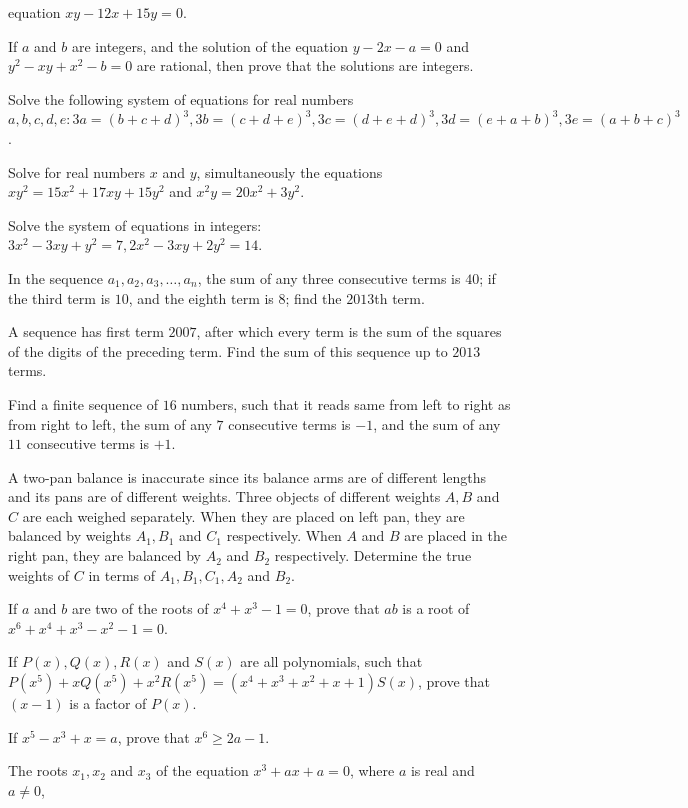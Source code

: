   equation $xy - 12x + 15y = 0$.
\item If $a$ and $b$ are integers, and the solution of the equation $y - 2x - a = 0$ and $y^2 - xy + x^2 - b
  = 0$ are rational, then prove that the solutions are integers.
\item Solve the following system of equations for real numbers $a, b, c, d, e: 3a = (b + c + d)^3, 3b = (c +
  d + e)^3, 3c = (d + e + d)^3, 3d = (e + a + b)^3, 3e = (a + b + c)^3$.
\item Solve for real numbers $x$ and $y$, simultaneously the equations $xy^2 = 15x^2 + 17xy + 15y^2$ and
  $x^2y = 20x^2 + 3y^2$.
\item Solve the system of equations in integers: $3x^2 - 3xy + y^2 = 7, 2x^2 - 3xy + 2y^2 = 14$.
\item In the sequence $a_1, a_2, a_3, \ldots, a_n$, the sum of any three consecutive terms is $40$; if the
  third term is $10$, and the eighth term is $8$; find the $2013$th term.
\item A sequence  has first term $2007$, after which every term is the sum of the squares of the digits of
  the preceding term. Find the sum of this sequence up to $2013$ terms.
\item Find a finite sequence of $16$ numbers, such that it reads same from left to right as from right to
  left, the sum of any $7$ consecutive terms is $-1$, and the sum of any $11$ consecutive terms is $+1$.
\item A two-pan balance is inaccurate since its balance arms are of different lengths and its pans are of
  different weights. Three objects of different weights $A, B$ and $C$ are each weighed separately. When
  they are placed on left pan, they are balanced by weights $A_1, B_1$ and $C_1$ respectively. When $A$ and
  $B$ are placed in the right pan, they are balanced by $A_2$ and $B_2$ respectively. Determine the true
  weights of $C$ in terms of $A_1, B_1, C_1, A_2$ and $B_2$.
\item If $a$ and $b$ are two of the roots of $x^4 + x^3 - 1 = 0$, prove that $ab$ is a root of $x^6 + x^4 +
  x^3 - x^2 - 1 = 0$.
\item If $P(x), Q(x), R(x)$ and $S(x)$ are all polynomials, such that $P(x^5) + xQ(x^5) + x^2R(x^5) = (x^4 +
  x^3 + x^2 + x + 1)S(x)$, prove that $(x - 1)$ is a factor of $P(x)$.
\item If $x^5 - x^3 + x = a$, prove that $x^6\geq 2a - 1$.
\item The roots $x_1, x_2$ and $x_3$ of the equation $x^3 + ax + a = 0$, where $a$ is real and $a\neq 0$,
